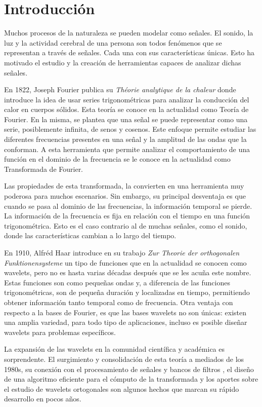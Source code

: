 \chapter*{Introducción}\label{chapter:introduction}

Muchos procesos de la naturaleza se pueden modelar como señales. El sonido, la luz y la actividad
cerebral de una persona son todos fenómenos que se representan a través de señales. Cada una con
sus características únicas. Esto ha motivado el estudio y la creación de herramientas capaces
de analizar dichas señales. 

En 1822, Joseph Fourier publica su \textit{Théorie analytique de la chaleur} \cite{Fourier2009} donde introduce la idea de usar
series trigonométricas para analizar la conducción del calor en cuerpos sólidos. Esta teoría se conoce en
la actualidad como Teoría de Fourier. En la misma, se plantea que una señal se puede representar como
una serie, posiblemente infinita, de senos y cosenos. Este enfoque permite estudiar las diferentes 
frecuencias presentes en una señal y la amplitud de las ondas que la conforman. A esta herramienta que permite
analizar el comportamiento de una función en el dominio de la frecuencia se le conoce en la actualidad como
Transformada de Fourier.

Las propiedades de esta transformada, la convierten en una herramienta muy poderosa para muchos escenarios. 
Sin embargo, su principal desventaja es que cuando se pasa al dominio de las frecuencias, la información 
temporal se pierde. La información de la frecuencia es fija en relación con el tiempo en una función 
trigonométrica. Esto es el caso contrario al de muchas señales, como el sonido, donde las características
cambian a lo largo del tiempo. 

En 1910, Alfréd Haar introduce en su trabajo \textit{Zur Theorie der orthogonalen Funktionensysteme} \cite{Haar1910} un tipo de
funciones que en la actualidad se conocen como wavelets, pero no es
hasta varias décadas después que se les acuña este nombre. Estas funciones son como pequeñas ondas y, a diferencia
de las funciones trigonométricas, son de pequeña duración y localizadas en tiempo, permitiendo obtener información tanto temporal como
de frecuencia. Otra ventaja con respecto a la bases de Fourier, es que las bases wavelets no son únicas: 
existen una amplia variedad, para todo tipo de aplicaciones, incluso es posible diseñar wavelets para problemas
específicos.

La expansión de las wavelets en la comunidad científica y académica es sorprendente.
El surgimiento y consolidación de esta teoría a mediados de los 1980s, su conexión con el procesamiento
de señales y bancos de filtros \cite{Mallat2008}, el diseño de una algoritmo eficiente para el cómputo de la transformada \cite{Mallat2008}
y los aportes sobre el estudio de wavelets ortogonales \cite{daubechies1992} son algunos hechos que marcan su rápido desarrollo en
pocos años.   

